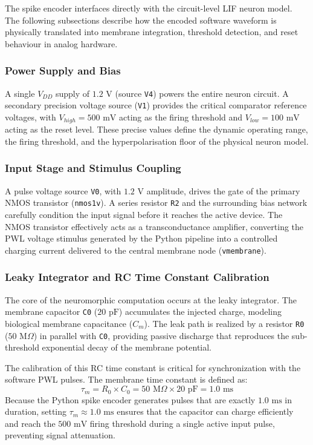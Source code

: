 \documentclass{ieeeaccess}
\begin{document}
The spike encoder interfaces directly with the circuit-level LIF neuron model. The following subsections describe how the encoded software waveform is physically translated into membrane integration, threshold detection, and reset behaviour in analog hardware.

\subsubsection{Power Supply and Bias}
A single $V_{DD}$ supply of $1.2\text{ V}$ (source \texttt{V4}) powers the entire neuron circuit. A secondary precision voltage source (\texttt{V1}) provides the critical comparator reference voltages, with $V_{high} = 500\text{ mV}$ acting as the firing threshold and $V_{low} = 100\text{ mV}$ acting as the reset level. These precise values define the dynamic operating range, the firing threshold, and the hyperpolarisation floor of the physical neuron model.

\subsubsection{Input Stage and Stimulus Coupling}
A pulse voltage source \texttt{V0}, with $1.2\text{ V}$ amplitude, drives the gate of the primary NMOS transistor (\texttt{nmos1v}). A series resistor \texttt{R2} and the surrounding bias network carefully condition the input signal before it reaches the active device. The NMOS transistor effectively acts as a transconductance amplifier, converting the PWL voltage stimulus generated by the Python pipeline into a controlled charging current delivered to the central membrane node (\texttt{vmembrane}).

\subsubsection{Leaky Integrator and RC Time Constant Calibration}
The core of the neuromorphic computation occurs at the leaky integrator. The membrane capacitor \texttt{C0} ($20\text{ pF}$) accumulates the injected charge, modeling biological membrane capacitance ($C_m$). The leak path is realized by a resistor \texttt{R0} ($50\text{ M}\Omega$) in parallel with \texttt{C0}, providing passive discharge that reproduces the sub-threshold exponential decay of the membrane potential. 

The calibration of this RC time constant is critical for synchronization with the software PWL pulses. The membrane time constant is defined as:
\begin{equation}
\tau_m = R_0 \times C_0 = 50\text{ M}\Omega \times 20\text{ pF} = 1.0\text{ ms}
\end{equation}
Because the Python spike encoder generates pulses that are exactly $1.0\text{ ms}$ in duration, setting $\tau_m \approx 1.0\text{ ms}$ ensures that the capacitor can charge efficiently and reach the $500\text{ mV}$ firing threshold during a single active input pulse, preventing signal attenuation.
\end{document}
